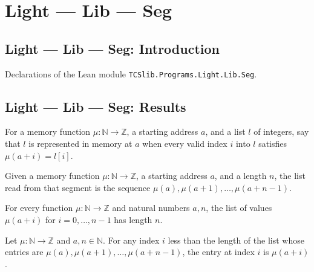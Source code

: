 \section{Light --- Lib --- Seg}
\subsection*{Light --- Lib --- Seg: Introduction}

Declarations of the Lean module \texttt{TCSlib.Programs.Light.Lib.Seg}.

\subsection*{Light --- Lib --- Seg: Results}

\begin{definition}
\label{Light.Seg}
\leanok
For a memory function $\mu:\mathbb{N}\to\mathbb{Z}$, a starting address $a$, and a list
$l$ of integers, say that $l$ is represented in memory at $a$ when every valid index $i$
into $l$ satisfies $\mu(a+i)=l[i]$.
\end{definition}

\begin{definition}
\label{Light.readSeg}
\leanok
Given a memory function $\mu:\mathbb{N}\to\mathbb{Z}$, a starting address $a$, and a
length $n$, the list read from that segment is the sequence
$\mu(a),\mu(a+1),\ldots,\mu(a+n-1)$.
\end{definition}

\begin{theorem}
\label{Light.length_readSeg}
\leanok
{}
For every function $\mu:\mathbb N\to\mathbb Z$ and natural numbers $a,n$, the list of
values $\mu(a+i)$ for $i=0,\ldots,n-1$ has length $n$.
\end{theorem}

\begin{theorem}
\label{Light.getElem_readSeg}
\leanok
{}
Let $\mu:\mathbb N\to\mathbb Z$ and $a,n\in\mathbb N$. For any index $i$ less than the
length of the list whose entries are $\mu(a),\mu(a+1),\ldots,\mu(a+n-1)$, the entry at
index $i$ is $\mu(a+i)$.
\end{theorem}

